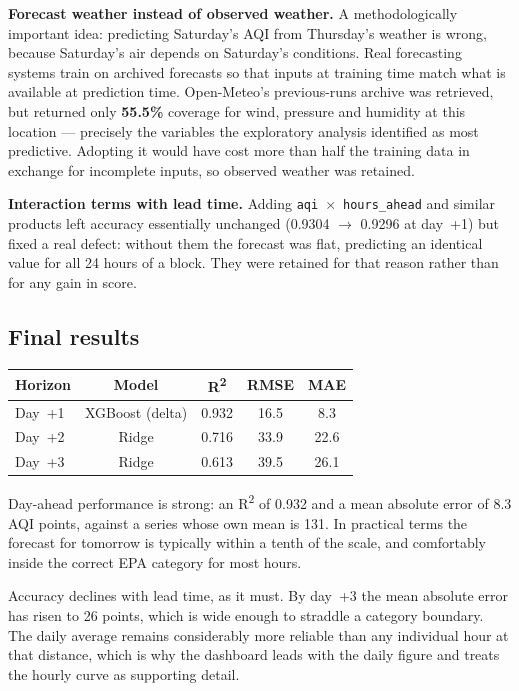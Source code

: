 \documentclass[11pt,a4paper]{article}
\begin{document}
\textbf{Forecast weather instead of observed weather.} A methodologically
important idea: predicting Saturday's AQI from Thursday's weather is
wrong, because Saturday's air depends on Saturday's conditions. Real
forecasting systems train on archived forecasts so that inputs at
training time match what is available at prediction time. Open-Meteo's
previous-runs archive was retrieved, but returned only \textbf{55.5\%}
coverage for wind, pressure and humidity at this location --- precisely
the variables the exploratory analysis identified as most predictive.
Adopting it would have cost more than half the training data in exchange
for incomplete inputs, so observed weather was retained.

\textbf{Interaction terms with lead time.} Adding
\texttt{aqi}~$\times$~\texttt{hours\_ahead} and similar products left
accuracy essentially unchanged (0.9304 $\rightarrow$ 0.9296 at day~+1)
but fixed a real defect: without them the forecast was flat, predicting
an identical value for all 24 hours of a block. They were retained for
that reason rather than for any gain in score.

\subsection{Final results}

\begin{center}
\begin{tabular}{lcccc}
\toprule
\textbf{Horizon} & \textbf{Model} & \textbf{R\textsuperscript{2}} & \textbf{RMSE} & \textbf{MAE} \\
\midrule
Day~+1 & XGBoost (delta) & 0.932 & 16.5 & 8.3 \\
Day~+2 & Ridge           & 0.716 & 33.9 & 22.6 \\
Day~+3 & Ridge           & 0.613 & 39.5 & 26.1 \\
\bottomrule
\end{tabular}
\end{center}

Day-ahead performance is strong: an R\textsuperscript{2} of 0.932 and a
mean absolute error of 8.3 AQI points, against a series whose own mean
is 131. In practical terms the forecast for tomorrow is typically within
a tenth of the scale, and comfortably inside the correct EPA category
for most hours.

Accuracy declines with lead time, as it must. By day~+3 the mean
absolute error has risen to 26 points, which is wide enough to straddle
a category boundary. The daily average remains considerably more
reliable than any individual hour at that distance, which is why the
dashboard leads with the daily figure and treats the hourly curve as
supporting detail.
\end{document}
